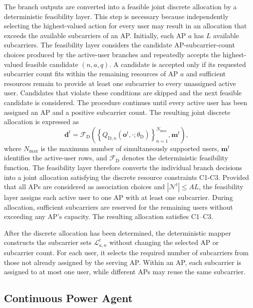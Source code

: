\documentclass[journal]{IEEEtran}
\begin{document}
The branch outputs are converted into a feasible joint discrete
allocation by a deterministic feasibility layer. This step is
necessary because independently selecting the highest-valued action
for every user may result in an allocation that exceeds the
available subcarriers of an AP. Initially, each AP $a$ has $L$
available subcarriers. The feasibility layer considers the candidate
AP-subcarrier-count choices produced by the active-user branches and
repeatedly accepts the highest-valued feasible candidate $(n,a,q)$.
A candidate is accepted only if its requested subcarrier count fits
within the remaining resources of AP $a$ and sufficient resources
remain to provide at least one subcarrier to every unassigned active
user. Candidates that violate these conditions are skipped and the
next feasible candidate is considered. The procedure continues until
every active user has been assigned an AP and a positive subcarrier
count. The resulting joint discrete allocation is expressed as
\begin{equation}
    \mathbf{d}^{t}
    =
    \mathcal{F}_{\mathrm{D}}
    \left(
    \left\{
    Q_{\mathrm{D},n}
    (\mathbf{o}^{t},\cdot;\theta_{\mathrm{D}})
    \right\}_{n=1}^{N_{\max}},
    \mathbf{m}^{t}
    \right),
    \label{eq:discrete_feasibility_layer}
\end{equation}
where $N_{\max}$ is the maximum number of simultaneously supported
users, $\mathbf{m}^{t}$ identifies the active-user rows, and
$\mathcal{F}_{\mathrm{D}}$ denotes the deterministic feasibility
function. The feasibility layer therefore converts the individual
branch decisions into a joint allocation satisfying the discrete
resource constraints C1-C3. Provided that all APs are considered as association choices
and $|\mathcal{N}^{t}|\leq AL$, the feasibility layer assigns
each active user to one AP with at least one subcarrier.
During allocation, sufficient subcarriers are reserved for
the remaining users without exceeding any AP's capacity.
The resulting allocation satisfies C1--C3.

After the discrete allocation has been determined, the
deterministic mapper constructs the subcarrier sets
$\mathcal{L}_{a,n}^{t}$ without changing the selected AP
or subcarrier count. For each user, it selects the required
number of subcarriers from those not already assigned by
the serving AP. Within an AP, each
subcarrier is assigned to at most one user, while different
APs may reuse the same subcarrier.

\subsection{Continuous Power Agent}
\end{document}
